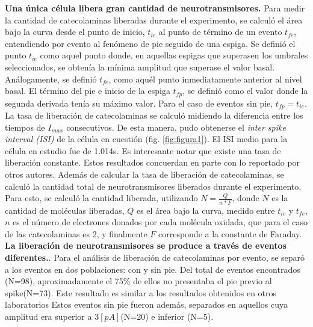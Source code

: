 \documentclass[twocolumn]{article}
\begin{document}
{\bf Una única célula libera gran cantidad de neurotransmisores.} Para medir la cantidad de catecolaminas liberadas durante el experimento, se calculó el área bajo la curva desde el punto de inicio, $t_{ie}$ al punto de término de un evento $t_{fe}$, entendiendo por evento al fenómeno de pie seguido de una espiga.  Se definió el punto $t_{ie}$ como aquel punto donde, en aquellas espigas que superasen los umbrales seleccionados, se obtenía la mínima amplitud que superase el valor basal.  Análogamente, se definió $t_{fe}$, como aquél punto inmediatamente anterior al nivel basal. El término del pie e inicio de la espiga $t_{fp}$, se definió como el valor donde la segunda derivada tenía su máximo valor\citep{evanko2005primer}.  Para el caso de eventos sin pie, $t_{fp} = t_{ie}$.
La tasa de liberación de catecolaminas se calculó midiendo la diferencia entre los tiempos de $I_{max}$ consecutivos.  De esta manera, pudo obtenerse el \textit{inter spike interval (ISI)} de la célula en cuestión (fig. \ref{fig:figura1}). El ISI medio para la célula en estudio fue de 1.014s.  
Es interesante notar que existe una tasa de liberación constante. Estos resultados concuerdan en parte con lo reportado por otros autores\citep{jarukanont2015vesicle}.  
Además de calcular la tasa de liberación de catecolaminas, se calculó la cantidad total de neurotransmisores liberados durante el experimento.  Para esto, se calculó la cantidad liberada, utilizando $N = \frac{Q}{n*F}$, donde $N$ es la cantidad de moléculas liberadas, $Q$ es el área bajo la curva, medido entre $t_{ie}$ y $t_{fe}$, $n$ es el número de electrones donados por cada molécula oxidada, que para el caso de las catecolaminas es 2, y finalmente $F$ corresponde a la constante de Faraday\citep{evanko2005primer}.\\

{\bf La liberación de neurotransmisores se produce a través de eventos diferentes.}. Para el análisis de liberación de catecolaminas por evento, se separó a los eventos en dos poblaciones: con y sin pie.  Del total de eventos encontrados (N=98), aproximadamente el 75\% de ellos no presentaba el pie previo al spike(N=73). Este resultado es similar a los resultados obtenidos en otros laboratorios \cite{amatore2005correlation,amatore2009quantitative}  Estos eventos sin pie fueron además, separados en aquellos cuya amplitud era superior a $3[pA]$(N=20) e inferior (N=5).
\end{document}
